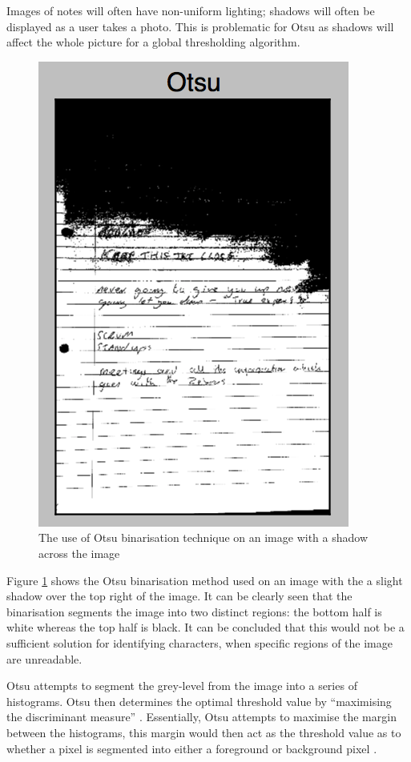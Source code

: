 Images of notes will often have non-uniform lighting; shadows will often be displayed as a user takes a photo. This is problematic for Otsu as shadows will affect the whole picture for a global thresholding algorithm.

\begin{figure}[H]
  \centering
  \includegraphics{images/OTSU}
  \caption{The use of Otsu binarisation technique on an image with a shadow across the image}
  \label{fig:OTSU}
\end{figure}

Figure \ref{fig:OTSU} shows the Otsu binarisation method used on an image with the a slight shadow over the top right of the image. It can be clearly seen that the binarisation segments the image into two distinct regions: the bottom half is white whereas the top half is black. It can be concluded that this would not be a sufficient solution for identifying characters, when specific regions of the image are unreadable.

Otsu attempts to segment the grey-level from the image into a series of histograms. Otsu then determines the optimal threshold value by ``maximising the discriminant measure'' \cite{citeulike:2917492}. Essentially, Otsu attempts to maximise the margin between the histograms, this margin would then act as the threshold value as to whether a pixel is segmented into either a foreground or background pixel \cite{citeulike:14021372}.

